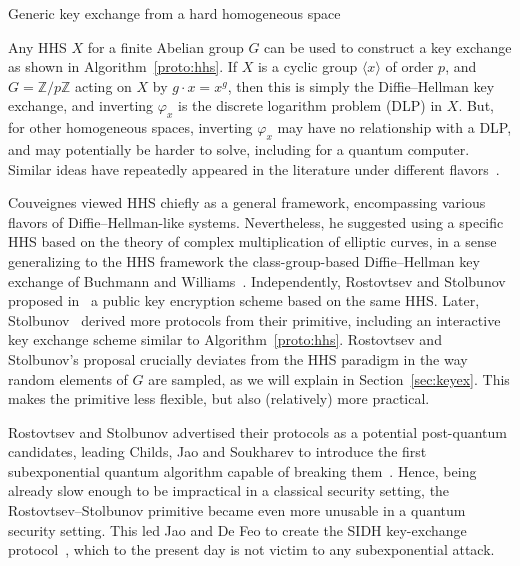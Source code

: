 \documentclass{article}
\theoremstyle{definition}
\begin{document}
\begin{algorithm}
  \caption{Generic key exchange from a hard homogeneous space}
  \label{proto:hhs}
\end{algorithm}

Any HHS $X$ for a finite Abelian group $G$ can be used to construct a
key exchange as shown in Algorithm~\ref{proto:hhs}.  If $X$ is a
cyclic group $〈x〉$ of order $p$, and $G=ℤ/pℤ$ acting on $X$ by
$g·x=x^g$, then this is simply the Diffie--Hellman key exchange, and
inverting $φ_x$ is the discrete logarithm problem (DLP) in $X$.  But,
for other homogeneous spaces, inverting $φ_x$ may have no relationship
with a DLP, and may potentially be harder to solve, including for a
quantum computer. Similar ideas have repeatedly appeared in the
literature under different
flavors~\cite{10.1007/3-540-44598-6_10,monico2007}.

Couveignes viewed HHS chiefly as a general framework, encompassing
various flavors of Diffie--Hellman-like systems. Nevertheless, he
suggested using a specific HHS based on the theory of complex
multiplication of elliptic curves, in a sense generalizing to the HHS
framework the class-group-based Diffie--Hellman key exchange of
Buchmann and Williams~\cite{Buchmann1988}. Independently, Rostovtsev
and Stolbunov proposed in~\cite{rostovtsev+stolbunov06} a public key
encryption scheme based on the same HHS. Later, Stolbunov~\cite{Stol}
derived more protocols from their primitive, including an interactive
key exchange scheme similar to Algorithm~\ref{proto:hhs}.  Rostovtsev
and Stolbunov's proposal crucially deviates from the HHS paradigm in
the way random elements of $G$ are sampled, as we will explain in
Section~\ref{sec:keyex}. This makes the primitive less flexible, but
also (relatively) more practical.

Rostovtsev and Stolbunov advertised their protocols as a potential
post-quantum candidates, leading Childs, Jao and Soukharev to introduce
the first subexponential quantum algorithm capable of breaking
them~\cite{childs2014constructing}. Hence, being already slow enough to
be impractical in a classical security setting, the
Rostovtsev--Stolbunov primitive became even more unusable in a quantum
security setting. This led Jao and De Feo to create the SIDH
key-exchange protocol~\cite{jao+defeo2011}, which to the present day
is not victim to any subexponential attack.
\end{document}

